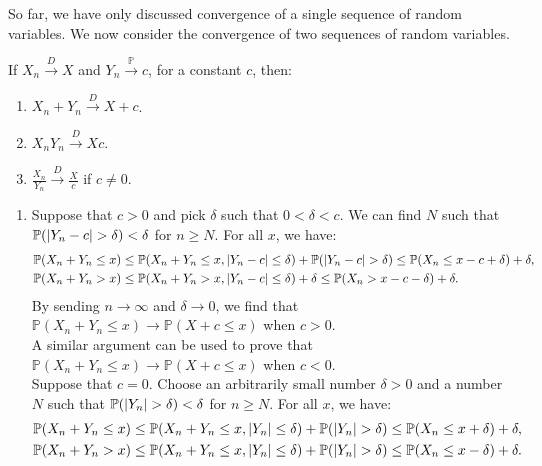 \documentclass{huhtakm-template-book-v2}
\newcommand{\prob}{\mathbb{P}}
\begin{document}
    So far, we have only discussed convergence of a single sequence of random variables. We now consider the convergence of two sequences of random variables.
    \begin{thm}
        If $X_{n} \xrightarrow{D} X$ and $Y_{n} \xrightarrow{\prob} c$, for a constant $c$, then:
        \begin{enumerate}
            \item $X_{n}+Y_{n} \xrightarrow{D} X+c$.
            \item $X_{n}Y_{n} \xrightarrow{D} Xc$.
            \item $\frac{X_{n}}{Y_{n}} \xrightarrow{D} \frac{X}{c}$ if $c \neq 0$.
        \end{enumerate}
    \end{thm}
    \begin{proofing}
        \begin{enumerate}
            \item Suppose that $c > 0$ and pick $\delta$ such that $0 < \delta < c$. We can find $N$ such that $\prob(\abs{Y_{n}-c} > \delta) < \delta$ for $n \geq N$. For all $x$, we have:
            \begin{align*}
                \prob(X_{n}+Y_{n} \leq x) &\leq \prob(X_{n}+Y_{n} \leq x,\abs{Y_{n}-c} \leq \delta)+\prob(\abs{Y_{n}-c} > \delta) \leq \prob(X_{n} \leq x-c+\delta)+\delta,\\
                \prob(X_{n}+Y_{n} > x) &\leq \prob(X_{n}+Y_{n} > x,\abs{Y_{n}-c} \leq \delta)+\delta \leq \prob(X_{n} > x-c-\delta)+\delta.
            \end{align*}
            By sending $n \to \infty$ and $\delta \to 0$, we find that $\prob(X_{n}+Y_{n} \leq x) \to \prob(X+c \leq x)$ when $c > 0$.\\
            A similar argument can be used to prove that $\prob(X_{n}+Y_{n} \leq x) \to \prob(X+c \leq x)$ when $c < 0$.\\
            Suppose that $c = 0$. Choose an arbitrarily small number $\delta > 0$ and a number $N$ such that $\prob(\abs{Y_{n}} > \delta) < \delta$ for $n \geq N$. For all $x$, we have:
            \begin{align*}
                \prob(X_{n}+Y_{n} \leq x) &\leq \prob(X_{n}+Y_{n} \leq x,\abs{Y_{n}} \leq \delta)+\prob(\abs{Y_{n}} > \delta) \leq \prob(X_{n} \leq x+\delta)+\delta,\\
                \prob(X_{n}+Y_{n} > x) &\leq \prob(X_{n}+Y_{n} \leq x,\abs{Y_{n}} \leq \delta)+\prob(\abs{Y_{n}} > \delta) \leq \prob(X_{n} \leq x-\delta)+\delta.

\end{align*}
\end{enumerate}
\end{proofing}
\end{document}
